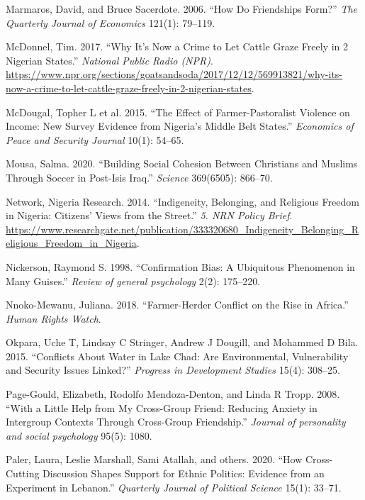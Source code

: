 \documentclass[11pt]{article}
\begin{document}
\begin{cslreferences}
\leavevmode\hypertarget{ref-marmaros2006friendships}{}%
Marmaros, David, and Bruce Sacerdote. 2006. ``How Do Friendships Form?''
\emph{The Quarterly Journal of Economics} 121(1): 79--119.

\leavevmode\hypertarget{ref-mcdonnel2017graze}{}%
McDonnel, Tim. 2017. ``Why It's Now a Crime to Let Cattle Graze Freely
in 2 Nigerian States.'' \emph{National Public Radio (NPR)}.
\url{https://www.npr.org/sections/goatsandsoda/2017/12/12/569913821/why-its-now-a-crime-to-let-cattle-graze-freely-in-2-nigerian-states}.

\leavevmode\hypertarget{ref-mcdougal2015effect}{}%
McDougal, Topher L et al. 2015. ``The Effect of Farmer-Pastoralist
Violence on Income: New Survey Evidence from Nigeria's Middle Belt
States.'' \emph{Economics of Peace and Security Journal} 10(1): 54--65.

\leavevmode\hypertarget{ref-mousa2020building}{}%
Mousa, Salma. 2020. ``Building Social Cohesion Between Christians and
Muslims Through Soccer in Post-Isis Iraq.'' \emph{Science} 369(6505):
866--70.

\leavevmode\hypertarget{ref-nigeria2014freedom}{}%
Network, Nigeria Research. 2014. ``Indigeneity, Belonging, and Religious
Freedom in Nigeria: Citizens' Views from the Street.'' \emph{5. NRN
Policy Brief}.
\url{https://www.researchgate.net/publication/333320680_Indigeneity_Belonging_Religious_Freedom_in_Nigeria}.

\leavevmode\hypertarget{ref-nickerson1998confirmation}{}%
Nickerson, Raymond S. 1998. ``Confirmation Bias: A Ubiquitous Phenomenon
in Many Guises.'' \emph{Review of general psychology} 2(2): 175--220.

\leavevmode\hypertarget{ref-hrw2018farmer}{}%
Nnoko-Mewanu, Juliana. 2018. ``Farmer-Herder Conflict on the Rise in
Africa.'' \emph{Human Rights Watch}.

\leavevmode\hypertarget{ref-okpara2015conflicts}{}%
Okpara, Uche T, Lindsay C Stringer, Andrew J Dougill, and Mohammed D
Bila. 2015. ``Conflicts About Water in Lake Chad: Are Environmental,
Vulnerability and Security Issues Linked?'' \emph{Progress in
Development Studies} 15(4): 308--25.

\leavevmode\hypertarget{ref-page2008little}{}%
Page-Gould, Elizabeth, Rodolfo Mendoza-Denton, and Linda R Tropp. 2008.
``With a Little Help from My Cross-Group Friend: Reducing Anxiety in
Intergroup Contexts Through Cross-Group Friendship.'' \emph{Journal of
personality and social psychology} 95(5): 1080.

\leavevmode\hypertarget{ref-paler2020cross}{}%
Paler, Laura, Leslie Marshall, Sami Atallah, and others. 2020. ``How
Cross-Cutting Discussion Shapes Support for Ethnic Politics: Evidence
from an Experiment in Lebanon.'' \emph{Quarterly Journal of Political
Science} 15(1): 33--71.


\end{cslreferences}
\end{document}
